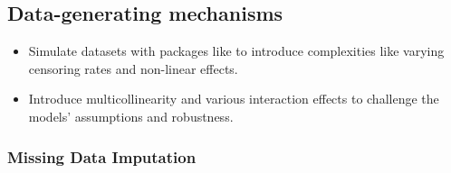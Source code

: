 \subsection{Data-generating mechanisms}
\begin{itemize}
\item Simulate datasets with packages like \parencite{davidson-pilon_lifelines_2024} to introduce complexities like varying censoring rates and non-linear effects.
\item Introduce multicollinearity and various interaction effects to challenge the models' assumptions and robustness.
\end{itemize}

\subsubsection{Missing Data Imputation}

